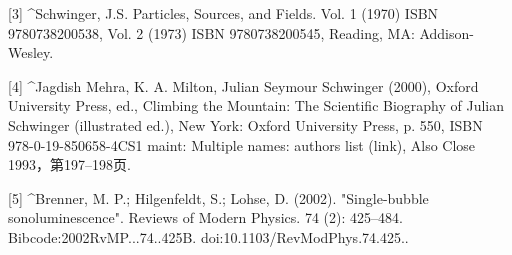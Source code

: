 [3]
^Schwinger, J.S. Particles, Sources, and Fields. Vol. 1 (1970) ISBN 9780738200538, Vol. 2 (1973) ISBN 9780738200545, Reading, MA: Addison-Wesley.

[4]
^Jagdish Mehra, K. A. Milton, Julian Seymour Schwinger (2000), Oxford University Press, ed., Climbing the Mountain: The Scientific Biography of Julian Schwinger (illustrated ed.), New York: Oxford University Press, p. 550, ISBN 978-0-19-850658-4CS1 maint: Multiple names: authors list (link), Also Close 1993，第197–198页.

[5]
^Brenner, M. P.; Hilgenfeldt, S.; Lohse, D. (2002). "Single-bubble sonoluminescence". Reviews of Modern Physics. 74 (2): 425–484. Bibcode:2002RvMP...74..425B. doi:10.1103/RevModPhys.74.425..